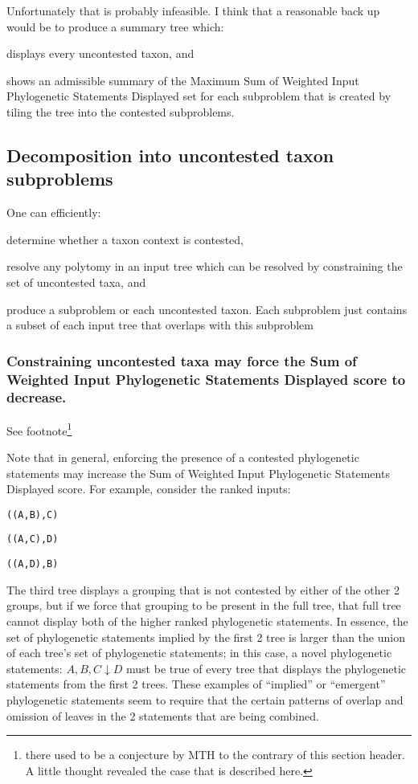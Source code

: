 \documentclass[11pt]{article}
\newcommand{\pss}{phylogenetic statements\xspace}
\newcommand{\PSs}{Phylogenetic Statements\xspace}
\newcommand{\SWIPSD}{Sum of Weighted Input \PSs Displayed\xspace}
\newcommand{\MSWIPSD}{Maximum \SWIPSD \xspace}
\newcommand{\newick}[1]{\texttt{#1}\xspace}
\newcommand{\vvps}[2]{\ensuremath{{#1}\downarrow{#2}}}
\begin{document}
Unfortunately that is probably infeasible.  I think that a reasonable back up would be to 
    produce a summary tree which:
\begin{compactenum}
    \item displays every uncontested taxon, and
    \item shows an admissible summary of the \MSWIPSD set for each subproblem that is
       created by tiling the tree into the contested subproblems.
\end{compactenum}
\subsection{Decomposition into uncontested taxon subproblems}
One can efficiently:
\begin{compactenum}
    \item determine whether a taxon context is contested,
    \item resolve any polytomy in an input tree which can be resolved by constraining
        the set of uncontested taxa, and
    \item produce a subproblem or each uncontested taxon. Each subproblem just contains
        a subset of each input tree that overlaps with this subproblem
\end{compactenum}

\subsubsection{Constraining uncontested taxa may force the \SWIPSD score to decrease.}
See footnote\footnote{there used to be a conjecture by MTH to the contrary of this section header.
A little thought revealed the case that is described here.}

Note that in general, enforcing the presence of a contested \pss may increase the 
    \SWIPSD score.
For example, consider the ranked inputs:
\begin{compactenum}
\item \newick{((A,B),C)}
\item \newick{((A,C),D)}
\item \newick{((A,D),B)}
\end{compactenum}
The third tree displays a grouping that is not contested by either of the other 2 groups, but
    if we force that grouping to be present in the full tree, that full tree cannot 
    display both of the higher ranked \pss.
In essence, the set of \pss implied by the first 2 tree is larger than the union of each tree's set
    of \pss; in this case, a novel \pss: \vvps{A,B,C}{D} must be true of every 
    tree that displays the \pss from the first 2 trees.
These examples of ``implied'' or ``emergent'' \pss seem to require that the certain
    patterns of overlap and omission of leaves in the 2 statements that are being combined.
\end{document}
